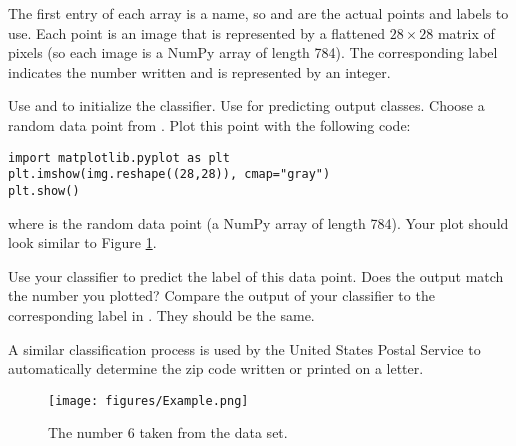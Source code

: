 The first entry of each array is a name, so  and  are the actual points and labels to use.
Each point is an image that is represented by a flattened $28 \times 28$ matrix of pixels (so each image is a NumPy array of length 784).
The corresponding label indicates the number written and is represented by an integer.

Use  and  to initialize the classifier. Use  for predicting output classes. Choose a random data point from . Plot this point with the following code:
\begin{lstlisting}
import matplotlib.pyplot as plt
plt.imshow(img.reshape((28,28)), cmap="gray")
plt.show()
\end{lstlisting}
where  is the random data point (a NumPy array of length 784). Your plot should look similar to Figure \ref{fig:digit}.

Use your classifier to predict the label of this data point.
Does the output match the number you plotted?
Compare the output of your classifier to the corresponding label in .
They should be the same.

\begin{comment}
The United States Postal Service has made a collection of labeled handwritten digits available to the public, provided in \texttt{PostalData.npz}.
Write a function that uses this data for $k$-nearest neighbor classification.
This data set may be loaded by using the following command:

\begin{lstlisting}
labels, points, testlabels, testpoints = np.load('PostalData.npz').items()
\end{lstlisting}

This contains a training set and a test set.
The first entry of each array is a name, so \li{labels[1]} and \li{points[1]} are the actual points and labels to use.
Each point is an image that is represented by a flattened $28 \times 28$ matrix of pixels (so each image is represented by a NumPy array of length 784).
The corresponding label indicates the number written, and is represented by an integer.

Use SciPy's \li{KDTree} class to build a $k$-d tree from the training set of digits. Perform the $k$-nearest neighbor algorithm on the first 50 nodes in \li{testpoints} using 1, 4, and 10 neighbors, with tie breaking implemented as described above (hint: try using \li{np.bincount()}). Calculate the accuracy of your model by comparing your output to the corresponding labels in \li{testlabels}. Return the accuracies of your model.
\end{comment}

A similar classification process is used by the United States Postal Service to automatically determine the zip code written or printed on a letter.

\begin{figure}[H]
\texttt{[image: figures/Example.png]}
\caption{The number 6 taken from the data set.}
\label{fig:digit}
\end{figure}
